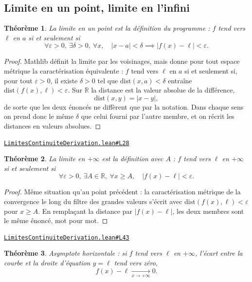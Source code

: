 \documentclass[11pt,a4paper]{article}
\theoremstyle{definition}
\theoremstyle{plain}
\newtheorem{theoreme}{Théorème}
\newcommand{\source}[2]{\par\smallskip\noindent\hfill{\footnotesize\href{#1}{\texttt{#2}}}\par\smallskip}
\begin{document}
\subsection{Limite en un point, limite en l'infini}

\begin{theoreme}
La limite en un point est la définition du programme : $f$ tend vers $\ell$ en $a$ si et
seulement si
\[ \forall \varepsilon > 0,\ \exists \delta > 0,\ \forall x,\quad
   |x - a| < \delta \implies |f(x) - \ell| < \varepsilon . \]
\end{theoreme}

\begin{proof}
Mathlib définit la limite par les voisinages, mais donne pour tout espace métrique la
caractérisation équivalente : $f$ tend vers $\ell$ en $a$ si et seulement si, pour tout
$\varepsilon > 0$, il existe $\delta > 0$ tel que $\mathrm{dist}(x, a) < \delta$ entraîne
$\mathrm{dist}(f(x), \ell) < \varepsilon$. Sur $\mathbb{R}$ la distance est la valeur
absolue de la différence,
\[ \mathrm{dist}(x, y) = |x - y| , \]
de sorte que les deux énoncés ne diffèrent que par la notation. Dans chaque sens on prend
donc le même $\delta$ que celui fourni par l'autre membre, et on récrit les distances en
valeurs absolues.
\end{proof}
\source{https://github.com/Commutator-IO/learn-lean/blob/main/courses/02-lycee/04-limites-continuite-derivation/LimitesContinuiteDerivation.lean\#L28}{LimitesContinuiteDerivation.lean\#L28}

\begin{theoreme}
La limite en $+\infty$ est la définition avec $A$ : $f$ tend vers $\ell$ en $+\infty$ si
et seulement si
\[ \forall \varepsilon > 0,\ \exists A \in \mathbb{R},\ \forall x \ge A,\quad
   |f(x) - \ell| < \varepsilon . \]
\end{theoreme}

\begin{proof}
Même situation qu'au point précédent : la caractérisation métrique de la convergence le
long du filtre des grandes valeurs s'écrit avec $\mathrm{dist}(f(x), \ell) < \varepsilon$
pour $x \ge A$. En remplaçant la distance par $|f(x) - \ell|$, les deux membres sont le
même énoncé, mot pour mot.
\end{proof}
\source{https://github.com/Commutator-IO/learn-lean/blob/main/courses/02-lycee/04-limites-continuite-derivation/LimitesContinuiteDerivation.lean\#L43}{LimitesContinuiteDerivation.lean\#L43}

\begin{theoreme}
Asymptote horizontale : si $f$ tend vers $\ell$ en $+\infty$, l'écart entre la courbe et
la droite d'équation $y = \ell$ tend vers zéro,
\[ f(x) - \ell \xrightarrow[x \to +\infty]{} 0 . \]
\end{theoreme}
\end{document}

